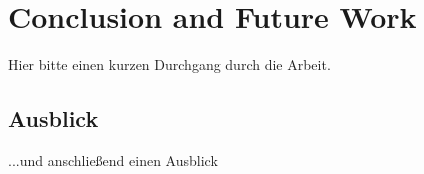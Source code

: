 
\chapter{Conclusion and Future Work}
\label{chap:zusfas}
Hier bitte einen kurzen Durchgang durch die Arbeit.

\section*{Ausblick}
...und anschließend einen Ausblick

